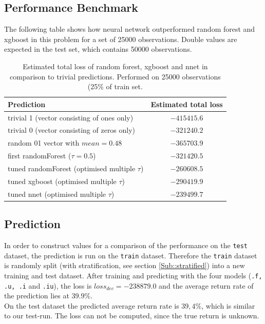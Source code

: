 \documentclass[a4paper,12pt]{article}
\begin{document}
\subsection{Performance Benchmark}

The following table shows how neural network outperformed random forest and xgboost in this problem for a set of 25000 observations. Double values are expected in the test set, which contains 50000 observations.

\begin{table}[h]
\centering
\label{my-label}
\begin{tabular}{|lc|}
\hline
\textbf{Prediction} & \textbf{Estimated total loss} \\
\hline \hline
trivial 1 (vector consisting of ones only)                         &  $- 415415.6   $            \\
trivial 0 (vector consisting of zeros only)                       & $- 321240.2 $            \\
random 01 vector with $mean=0.48$                            &  $- 365703.9  $                \\
\hline
first randomForest ($\tau=0.5$)                                     & $- 321420.5$                \\
tuned randomForest (optimised multiple $\tau$)          &  $-260608.5$               \\
tuned xgboost (optimised multiple $\tau$)         & $-290419.9$ \\
tuned nnet (optimised multiple $\tau$)                          & $-239499.7$                   \\
\hline
\end{tabular}
\caption{Estimated total loss of random forest, xgboost and nnet in comparison to trivial predictions. Performed on 25000 observations (25\% of train set.}
\end{table}

\subsection{Prediction}
In order to construct values for a comparison of the performance on the \texttt{test} dataset, the prediction is run on the \texttt{train} dataset. Therefore the \texttt{train} dataset is randomly split (with stratification, see section \ref{Sub::stratified}) into a new training and test dataset. After training and predicting with the four models (\texttt{.f, .u, .i} and \texttt{.iu}), the loss is $loss_{dec} = -238879.0  $ and the average return rate of the prediction lies at $39.9 \%$.\\
On the test dataset the predicted average return rate is $39,4 \%$, which is similar to our test-run. The loss can not be computed, since the true return is unknown.\\
\end{document}

